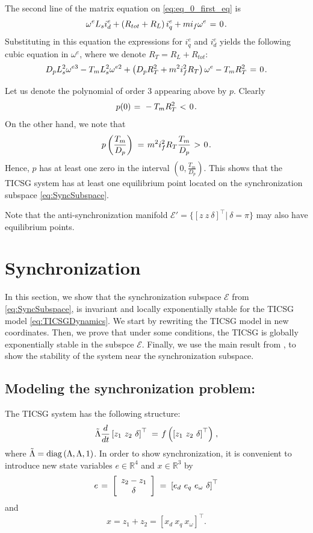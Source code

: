 \documentclass[letterpaper, 10 pt, conference]{ieeeconf}
\newcommand{\rline}  {{\mathbb R}}
\renewcommand{\o}    {{\omega}}
\newcommand{\m}      {{\hbox{\hskip 1pt}}}
\begin{document}
The second line of the matrix equation on \eqref{eq:eq_0_first_eq} is
$$ \o^{e}L_s i_d^e + \left(R_{tot} + R_L\right) i_q^e + mi_f\o^e 
   \m=\m 0 \m.$$
Substituting in this equation the expressions for $i_q^e$ and
$i_d^e$ yields the following cubic equation in $\o^e$, where
we denote $R_T=R_L+R_{tot}$:
$$ D_p L_s^2\o^{e3}-T_m L_s^2 \o^{e2} +\left(D_p R_T^2+m^2 i_f^2 
   R_T\right) \o^e - T_m R_T^2 \m=\m 0 \m.$$

Let us denote the polynomial of order 3 appearing above by $p$. 
Clearly \vspace{-2mm}
$$p(0) \m=\m -T_m R_T^2 \m<\m 0 \m.$$
On the other hand, we note that 
$$ p\left(\frac{T_m}{D_p}\right) \m=\m m^2 i_f^2 R_T\frac{T_m}{D_p} 
   \m>\m 0 \m.$$
Hence, $p$ has at least one zero in the interval $\left(0,
\frac{T_m}{D_p}\right)$. This shows that the TICSG system has at least
one equilibrium point located on the synchronization subspace 
\eqref{eq:SyncSubspace}.

Note that the anti-synchronization manifold $\mathscr{E}'=\{ \left[z
\ z \ \delta\right]^\top |\ \delta=\pi \}$ may also have equilibrium
points.

\section{Synchronization} \label{sec5} %

In this section, we show that the synchronization subspace
$\mathscr{E}$ from \eqref{eq:SyncSubspace}, is invariant and locally
exponentially stable for the TICSG model \eqref{eq:TICSGDynamics}.  We
start by rewriting the TICSG model in new coordinates. Then, we prove
that under some conditions, the TICSG is globally exponentially stable
in the subspce $\mathscr{E}$. Finally, we use the main result from
\cite{AndrieuJayawardhanaPraly}, to show the stability of the system
near the synchronization subspace.

\subsection{Modeling the synchronization problem:} 
\label{sec:SyncProbModel}

The TICSG system has the following structure:
$$ \tilde{\Lambda}\frac{d}{dt}\left[z_1\ z_2\ \delta\right]^{\top}
   \m=\m f\left( \left[z_1\ z_2\ \delta\right]^{\top} \right) \m,$$
where $\tilde{\Lambda}={\rm diag}\left(\Lambda,\Lambda,1\right)$.
In order to show synchronization, it is convenient to introduce new 
state variables $e\in\rline^4$ and $x\in\rline^3$ by
$$ e \m=\m \left[ \begin{array}{c} z_2 - z_1\\ \delta \end{array} 
   \right] \m=\m \left[e_d\ e_q\ e_\o\ \delta \right]^\top$$
and 
$$x =z_1+z_2 = \left[ x_d\ x_q\ x_\omega\right]^\top.$$  
\end{document}
